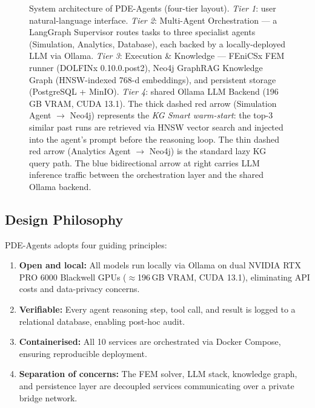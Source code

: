 \documentclass[twocolumn]{article}
\begin{document}
\begin{figure}[htbp]
  \centering
  \resizebox{\textwidth}{!}{}
  \caption{System architecture of PDE-Agents (four-tier layout).
    \textit{Tier 1}: user natural-language interface.
    \textit{Tier 2}: Multi-Agent Orchestration — a LangGraph Supervisor
    routes tasks to three specialist agents (Simulation, Analytics,
    Database), each backed by a locally-deployed LLM via Ollama.
    \textit{Tier 3}: Execution \& Knowledge — FEniCSx FEM runner
    (DOLFINx 0.10.0.post2), Neo4j GraphRAG Knowledge Graph
    (HNSW-indexed 768-d embeddings), and persistent storage
    (PostgreSQL + MinIO).
    \textit{Tier 4}: shared Ollama LLM Backend (196\,GB VRAM,
    CUDA 13.1).  The thick dashed red arrow (Simulation Agent
    $\rightarrow$ Neo4j) represents the \textit{KG Smart warm-start}:
    the top-3 similar past runs are retrieved via HNSW vector search
    and injected into the agent's prompt before the reasoning loop.
    The thin dashed red arrow (Analytics Agent $\rightarrow$ Neo4j)
    is the standard lazy KG query path.  The blue bidirectional arrow
    at right carries LLM inference traffic between the orchestration
    layer and the shared Ollama backend.}
  \label{fig:arch}
\end{figure}

\subsection{Design Philosophy}

PDE-Agents adopts four guiding principles:
\begin{enumerate}
  \item \textbf{Open and local:} All models run locally via Ollama on
        dual NVIDIA RTX PRO 6000 Blackwell GPUs ($\approx$196\,GB VRAM,
        CUDA 13.1), eliminating API costs and data-privacy concerns.
  \item \textbf{Verifiable:} Every agent reasoning step, tool call, and result
        is logged to a relational database, enabling post-hoc audit.
  \item \textbf{Containerised:} All 10 services are orchestrated via
        Docker Compose, ensuring reproducible deployment.
  \item \textbf{Separation of concerns:} The FEM solver, LLM stack,
        knowledge graph, and persistence layer are decoupled services
        communicating over a private bridge network.
\end{enumerate}
\end{document}
